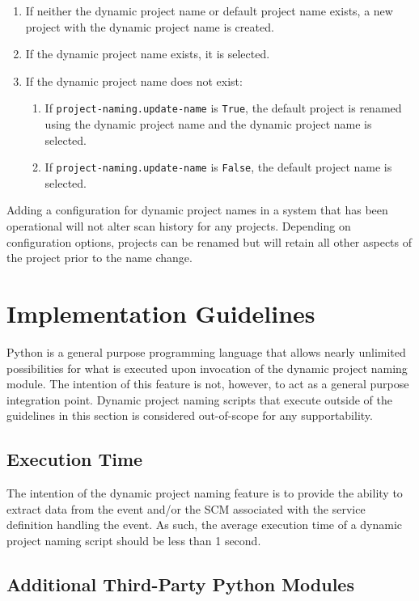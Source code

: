 \begin{enumerate}
  \item If neither the dynamic project name or default project name exists, a new project with the dynamic project name is created.
  \item If the dynamic project name exists, it is selected.
  \item If the dynamic project name does not exist:
  \begin{enumerate}
    \item If \texttt{project-naming.update-name} is \texttt{True}, the default project is renamed using the dynamic project name
    and the dynamic project name is selected.
    \item If \texttt{project-naming.update-name} is \texttt{False}, the default project name is selected.
  \end{enumerate}
\end{enumerate}

Adding a configuration for dynamic project names in a system that has been operational will not alter scan history
for any projects.  Depending on configuration options, projects can be renamed but will retain all other aspects
of the project prior to the name change.


\section{Implementation Guidelines}

Python is a general purpose programming language that allows nearly unlimited possibilities for what is
executed upon invocation of the dynamic project naming module.  The intention of this feature is not, however,
to act as a general purpose integration point.  Dynamic project naming scripts that execute outside of the
guidelines in this section is considered out-of-scope for any supportability.

\subsection{Execution Time}

The intention of the dynamic project naming feature is to provide the ability to extract data from the
event and/or the SCM associated with the service definition handling the event.  As such, the
average execution time of a dynamic project naming script should be less than 1 second.

\subsection{Additional Third-Party Python Modules}

